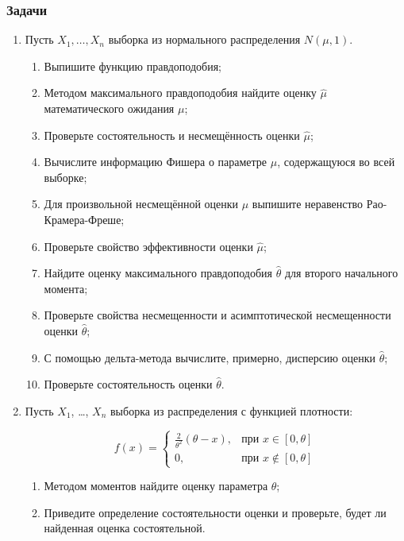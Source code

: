 \subsubsection*{Задачи}

\begin{enumerate}[resume]
\item Пусть $X_{1}, \ldots, X_{n}$ выборка из нормального распределения $N(\mu,1)$.
\begin{enumerate}
\item Выпишите функцию правдоподобия;
\item Методом максимального правдоподобия найдите оценку $\hat{\mu}$ математического
ожидания $\mu$;
\item Проверьте состоятельность и несмещённость оценки $\hat{\mu}$;
\item Вычислите информацию Фишера о параметре $\mu$, содержащуюся во всей выборке;
\item Для произвольной несмещённой оценки $\mu$ выпишите неравенство Рао-Крамера-Фреше;
\item Проверьте свойство эффективности оценки $\hat{\mu}$;
\item Найдите оценку максимального правдоподобия $\hat{\theta}$ для второго начального
момента;
\item Проверьте свойства несмещенности и асимптотической несмещенности оценки $\hat{\theta}$;
\item С помощью дельта-метода вычислите, примерно, дисперсию оценки $\hat{\theta}$;
\item Проверьте состоятельность оценки $\hat{\theta}$.
\end{enumerate}

 \item Пусть $X_{1}$, \ldots, $X_{n}$ выборка из распределения с функцией плотности:

\[
f(x)=\begin{cases}
\frac{2}{\theta^2}(\theta-x),&\text{при }x\in[0,\theta]\\
0,&\text{при }x\notin[0,\theta]
\end{cases}
\]

\begin{enumerate}
\item Методом моментов найдите оценку параметра $\theta$;
\item Приведите определение состоятельности оценки и проверьте, будет ли найденная
оценка состоятельной.
\end{enumerate}


\end{enumerate}
